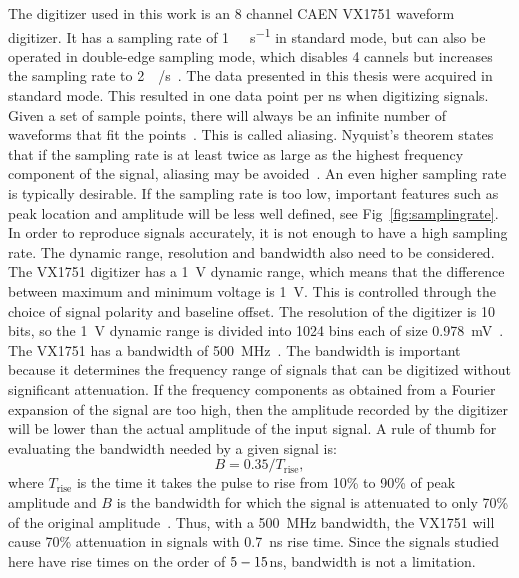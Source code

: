 \documentclass[main.tex]{subfiles}
\begin{document}
The digitizer used in this work is an 8 channel CAEN VX1751 waveform digitizer. It has a sampling rate of \si{1\giga\sample\per\second} in standard mode, but can also be operated in double-edge sampling mode, which disables 4 cannels but increases the sampling rate to \SI{2}{\giga\sample/\second}~\cite{CAEN}. The data presented in this thesis were acquired in standard mode. This resulted in one data point per \si{ns} when digitizing signals. Given a set of sample points, there will always be an infinite number of waveforms that fit the points~\cite{Spectrum}. This is called aliasing. Nyquist's theorem states that if the sampling rate is at least twice as large as the highest frequency component of the signal, aliasing may be avoided~\cite{Spectrum}. An even higher sampling rate is typically desirable. If the sampling rate is too low, important features such as peak location and amplitude will be less well defined, see Fig~\ref{fig:samplingrate}.
In order to reproduce signals accurately, it is not enough to have a high sampling rate. The dynamic range, resolution and bandwidth also need to be considered. 
The VX1751 digitizer has a \SI{1}{\volt} dynamic range, which means that the difference between maximum and minimum voltage is \SI{1}{\volt}. This is controlled through the choice of signal polarity and baseline offset. The resolution of the digitizer is 10 bits, so the \si{1\volt} dynamic range is divided into 1024 bins each of size \SI{0.978}{\milli\volt}~\cite{CAEN}.
The VX1751 has a bandwidth of \SI{500}{\mega\hertz}~\cite{CAEN}. The bandwidth is important because it determines the frequency range of signals that can be digitized without significant attenuation. If the frequency components as obtained from a Fourier expansion of the signal are too high, then the amplitude recorded by the digitizer will be lower than the actual amplitude of the input signal. A rule of thumb for evaluating the bandwidth needed by a given signal is:
\begin{equation}
\label{eq:bandwidth}
B=0.35/T_{\textrm{rise}},
\end{equation}
where $T_\textrm{rise}$ is the time it takes the pulse to rise from 10\% to 90\% of peak amplitude and $B$ is the bandwidth for which the signal is attenuated to only 70\% of the original amplitude~\cite{Leo}. Thus, with a \SI{500}{MHz} bandwidth, the VX1751 will cause 70\% attenuation in signals with \SI{0.7}{ns} rise time. Since the signals studied here have rise times on the order of $5\--15$\si{ns}, bandwidth is not a limitation.
\end{document}

